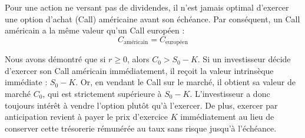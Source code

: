 \begin{theorembox}
Pour une action ne versant pas de dividendes, il n'est jamais optimal d'exercer une option d'achat (Call) américaine avant son échéance. Par conséquent, un Call américain a la même valeur qu'un Call européen :
\begin{equation}
    \label{eq:fsec2-call_americain}
    C_{\text{américain}} = C_{\text{européen}}
\end{equation}
\end{theorembox}

Nous avons démontré que si $r \ge 0$, alors $C_0 > S_0 - K$. 
Si un investisseur décide d'exercer son Call américain immédiatement, il reçoit la valeur intrinsèque immédiate : $S_0 - K$.
Or, en vendant le Call sur le marché, il obtient sa valeur de marché $C_0$, qui est strictement supérieure à $S_0 - K$. L'investisseur a donc toujours intérêt à vendre l'option plutôt qu'à l'exercer. De plus, exercer par anticipation revient à payer le prix d'exercice $K$ immédiatement au lieu de conserver cette trésorerie rémunérée au taux sans risque jusqu'à l'échéance.